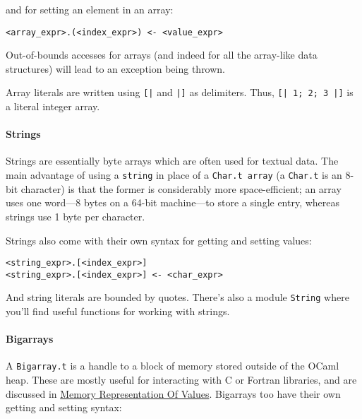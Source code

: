 and for setting an element in an array:

\begin{lstlisting}
<array_expr>.(<index_expr>) <- <value_expr>
\end{lstlisting}

Out-of-bounds accesses for arrays (and indeed for all the array-like
data structures) will lead to an exception being thrown.

Array literals are written using \passthrough{\lstinline![|!} and
\passthrough{\lstinline!|]!} as delimiters. Thus,
\passthrough{\lstinline![| 1; 2; 3 |]!} is a literal integer array.

\hypertarget{strings}{%
\paragraph{Strings}\label{strings}}

Strings are essentially byte arrays which are often used for textual
data. The main advantage of using a \passthrough{\lstinline!string!} in
place of a \passthrough{\lstinline!Char.t array!} (a
\passthrough{\lstinline!Char.t!} is an 8-bit character) is that the
former is considerably more space-efficient; an array uses one word---8
bytes on a 64-bit machine---to store a single entry, whereas strings use
1 byte per character. 

Strings also come with their own syntax for getting and setting values:

\begin{lstlisting}
<string_expr>.[<index_expr>]
<string_expr>.[<index_expr>] <- <char_expr>
\end{lstlisting}

And string literals are bounded by quotes. There's also a module
\passthrough{\lstinline!String!} where you'll find useful functions for
working with strings.

\hypertarget{bigarrays}{%
\paragraph{Bigarrays}\label{bigarrays}}

A \passthrough{\lstinline!Bigarray.t!} is a handle to a block of memory
stored outside of the OCaml heap. These are mostly useful for
interacting with C or Fortran libraries, and are discussed in
\href{runtime-memory-layout.html\#memory-representation-of-values}{Memory
Representation Of Values}. Bigarrays too have their own getting and
setting syntax: 

